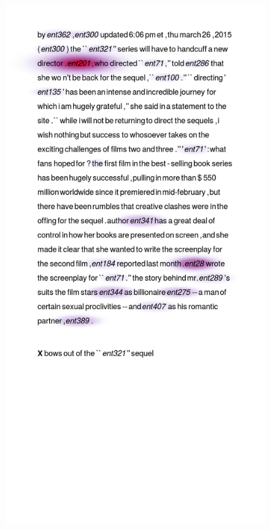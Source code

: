 \begin{figure}[h]
  \centering
  \includegraphics[scale=0.30,clip=true,trim=3cm 17cm 3cm 2cm]{figs/goodexamples/174.png}%

\end{figure}
